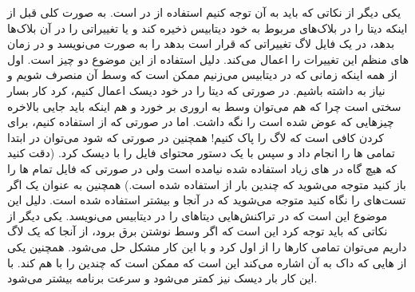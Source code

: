 یکی دیگر از نکاتی که باید به آن توجه کنیم استفاده از
در
است. به صورت کلی
قبل از اینکه دیتا را در بلاک‌های مربوط به خود دیتابیس ذخیره کند و یا تغییراتی را در آن
بلاک‌ها بدهد، در یک فایل لاگ تغییراتی که قرار است بدهد را به صورت
می‌نویسد و در زمان های منظم این تغییرات را اعمال می‌کند. دلیل استفاده از این موضوع دو چیز است.
اول از همه اینکه زمانی که در دیتابیس
می‌زنیم ممکن است که وسط آن منصرف شویم و نیاز به
داشته باشیم. در صورتی که دیتا را در خود دیسک اعمال کنیم،
کرد کار بسار سختی است چرا که هم می‌توان وسط
به اروری بر خورد و هم اینکه باید جایی بالاخره چیز‌هایی که عوض شده است را نگه داشت. اما در صورتی که از
استفاده کنیم، برای
کردن کافی است که لاگ را پاک کنیم! همچنین در صورتی که
شود می‌توان در ابتدا تمامی
ها
را انجام داد و سپس با یک دستور
محتوای فایل را با دیسک
کرد. (دقت کنید که هیچ گاه  در های زیاد استفاده شده نیامده است ولی در صورتی که فایل 
تمام
ها
را باز کنید متوجه می‌شوید که چندین بار از
استفاده شده است.)
همچنین به عنوان یک
اگر تست‌های
را نگاه کنید متوجه می‌شوید که در آنجا
 و 
بیشتر استفاده شده است. دلیل این موضوع این است که
در تراکنش‌هایی دیتا‌های
را در دیتابیس می‌نویسد.
یکی دیگر از نکاتی که باید توجه کرد این است که اگر وسط نوشتن برق برود، از آنجا که یک لاگ داریم
می‌توان تمامی کار‌ها را از اول
کرد و با این کار مشکل
حل می‌شود. همچنین یکی از
هایی
که داک
به آن اشاره می‌کند این است که ممکن است که چندین
را با هم
کند. با این کار بار دیسک نیز کمتر می‌شود و سرعت برنامه بیشتر می‌شود.

